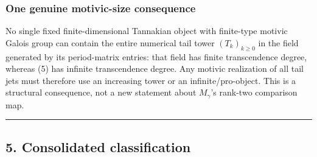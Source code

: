 \documentclass[11pt]{article}
\theoremstyle{keio}
\theoremstyle{definition}
\theoremstyle{remark}
\begin{document}
\subsubsection{One genuine motivic-size consequence}

No single fixed finite-dimensional Tannakian object with finite-type motivic
Galois group can contain the entire numerical tail tower \((T_k)_{k\ge0}\)
in the field generated by its period-matrix entries: that field has finite
transcendence degree, whereas (5) has infinite transcendence degree. Any
motivic realization of all tail jets must therefore use an increasing tower
or an infinite/pro-object. This is a structural consequence, not a new
statement about \(M_\gamma\)'s rank-two comparison map.

\begin{center}\rule{0.5\linewidth}{0.5pt}\end{center}

\subsection{5. Consolidated classification}
\end{document}
